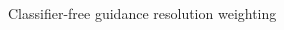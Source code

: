 \documentclass[8pt]{beamer}
\begin{document}
\begin{frame}{Classifier-free guidance resolution weighting}
\begin{columns}
\begin{column}{.5\textwidth}
\begin{figure}
                \label{fig:cfg_resolution_weighting}
            \end{figure}
        \end{column}
    \end{columns}
\end{frame}



\section{\bibname}
\begin{frame}[t, allowframebreaks]{\bibname}
    \printbibliography[heading=none]
\end{frame}
\end{document}

